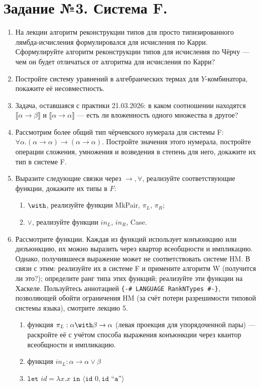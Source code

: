 \documentclass[10pt,a4paper,oneside]{article}
\begin{document}
\section*{Задание №3. Система F.}
\begin{enumerate}
\item На лекции алгоритм реконструкции типов для просто типизированного лямбда-исчисления формулировался для исчисления по Карри.
Сформулируйте алгоритм реконструкции типов для исчисления по Чёрчу --- чем он будет отличаться от алгоритма для исчисления по Карри?
\item Постройте систему уравнений в алгебраических термах для $Y$-комбинатора, покажите
её несовместность.
\item Задача, оставшаяся с практики 21.03.2026: в каком соотношении находятся 
$\llbracket \alpha\rightarrow\beta\rrbracket$ и $\llbracket \alpha\rightarrow\alpha \rrbracket$ ---
есть ли вложенность одного множества в другое?

\item Рассмотрим более общий тип чёрчевского нумерала для системы F:
$\forall \alpha.(\alpha\rightarrow\alpha)\rightarrow(\alpha\rightarrow\alpha)$.
Постройте значения этого нумерала, постройте операции сложения, умножения и возведения в 
степень для него, докажите их тип в системе F.

\item Выразите следующие связки через $\rightarrow, \forall$, реализуйте соответствующие функции, докажите их типы в $F$:
\begin{enumerate}
\item $\with$, реализуйте функции MkPair, $\pi_L$, $\pi_R$;
\item $\vee$, реализуйте функции $in_L$, $in_R$, Case.
\end{enumerate}
\item Рассмотрите функции. 
Каждая из функций использует конъюнкцию или дизъюнкцию, их можно выразить через квартор всеобщности и импликацию.
Однако, получившееся выражение может не соответствовать системе HM. В связи с этим:
реализуйте их в системе F и примените алгоритм W (получится ли это?); определите ранг типа этих функций;
реализуйте эти функции на Хаскеле.
Пользуйтесь аннотацией \verb!{-# LANGUAGE RankNTypes #-}!, позволяющей обойти ограничения HM (за счёт потери
разрешимости типовой системы языка), смотрите лекцию 5.
\begin{enumerate}
\item функция $\pi_L: \alpha\with\beta\rightarrow\alpha$ (левая проекция для упорядоченной пары) --- раскройте её с учётом способа
выражения конъюнкции через квантор всеобщности и импликацию.
\item функция $in_L: \alpha\rightarrow\alpha\vee\beta$
\item $\texttt{let }id = \lambda x.x\texttt{ in }\langle \texttt{id }0, \texttt{id ``a''}\rangle$
\end{enumerate}


\end{enumerate}
\end{document}
